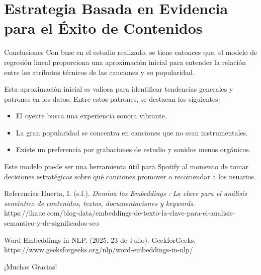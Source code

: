 \documentclass[10pt, xcolor=x11names,compress]{beamer}
\begin{document}
\section[Estrategia Basada en Evidencia para el Éxito de Contenidos]{Estrategia Basada en Evidencia para el Éxito de Contenidos}
\begin{frame}{Conclusiones}
    Con base en el estudio realizado, se tiene entonces que, el modelo de regresión lineal proporciona una aproximación inicial para 
    entender la relación entre los atributos técnicos de las canciones y su popularidad. \vspace{0.5em}

    Esta aproximación inicial es valiosa para identificar tendencias generales y patrones en los datos. Entre estos patrones, 
    se destacan los siguientes: \vspace{0.5em}

    \begin{itemize}
        \item <1-> El oyente busca una experiencia sonora vibrante.
        \vspace{0.5em}
        \item <1-> La gran popularidad se concentra en canciones que no sean instrumentales.
        \vspace{0.5em}
        \item <1-> Existe un preferencia por grabaciones de estudio y sonidos menos orgánicos.
        \vspace{0.5em}
    \end{itemize}

    Este modelo puede ser una herramienta útil para Spotify al momento de tomar decisiones estratégicas sobre qué canciones promover o recomendar 
    a los usuarios.

\end{frame}

\begin{frame}{Referencias}
\noindent\printbibliography Huerta, I. (s.f.). \textit{Domina los Embeddings : La clave para el análisis semántico de contenidos, textos, documentaciones y keywords}.
https://ikaue.com/blog-data/embeddings-de-texto-la-clave-para-el-analisis-semantico-y-de-significados-seo

\vspace{1em}

\noindent\printbibliography Word Embeddings in NLP. (2025, 23 de Julio). GeekforGeeks. https://www.geeksforgeeks.org/nlp/word-embeddings-in-nlp/
\end{frame}

\begin{frame}
 \begin{center}
        \vspace{3em}
		{\Huge ¡Muchas Gracias!}
	\end{center}
\end{frame}
\end{document}
